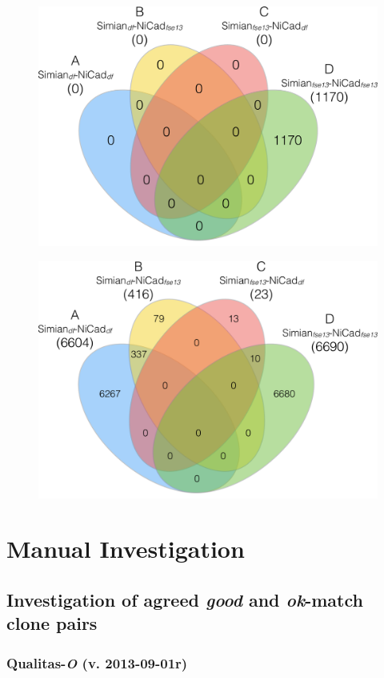\documentclass{IEEEtran}
\begin{document}
\begin{figure}
	\centering
	\begin{minipage}{.5\textwidth}
		\centering
		\includegraphics[width=0.7\linewidth]{venn4_pairs_good_new}
		\label{fig:venn4_new_good}
	\end{minipage}%
	\begin{minipage}{.5\textwidth}
		\centering
		\includegraphics[width=0.7\linewidth]{venn4_pairs_ok_new}
		\label{fig:venn4_new_ok}
	\end{minipage}
\end{figure}

\section*{Manual Investigation}

\subsection{Investigation of agreed \textit{good} and \textit{ok}-match clone pairs}

\subsubsection{Qualitas-\textit{O} (v. 2013-09-01r)}
\end{document}
